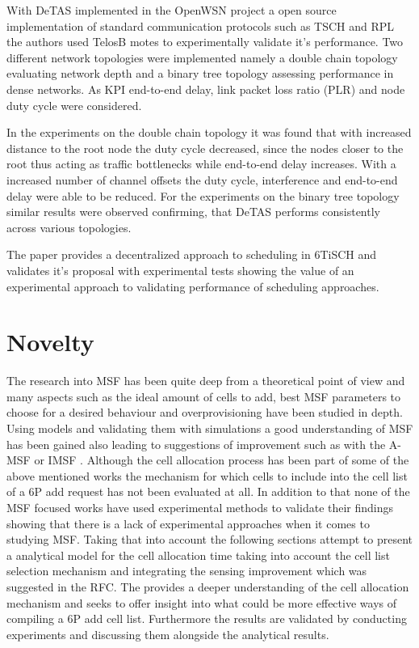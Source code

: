 \documentclass{comnets-thesis}
\begin{document}
With DeTAS implemented in the OpenWSN \cite{Watteyne2012} project a open source implementation of standard communication protocols such as \ac{TSCH} and \ac{RPL} the authors used TelosB motes to experimentally validate it's performance. Two different network topologies were implemented namely a double chain topology evaluating network depth and a binary tree topology assessing performance in dense networks. As \ac{KPI} end-to-end delay, link packet loss ratio (PLR) and node duty cycle were considered.

In the experiments on the double chain topology it was found that with increased distance to the root node the duty cycle decreased, since the nodes closer to the root thus acting as traffic bottlenecks while end-to-end delay increases. With a increased number of channel offsets the duty cycle, interference and end-to-end delay were able to be reduced.
For the experiments on the binary tree topology similar results were observed confirming, that DeTAS performs consistently across various topologies.

The paper provides a decentralized approach to scheduling in \ac{6TiSCH} and validates it's proposal with experimental tests showing the value of an experimental approach to validating performance of scheduling approaches.

\section{Novelty}
The research into \ac{MSF} has been quite deep from a theoretical point of view and many aspects such as the ideal amount of cells to add, best \ac{MSF} parameters to choose for a desired behaviour and overprovisioning have been studied in depth. Using models and validating them with simulations a good understanding of \ac{MSF} has been gained also leading to suggestions of improvement such as with the A-MSF  \cite{MSFPerformanceEvaluation} or IMSF \cite{IMSF}.
Although the cell allocation process has been part of some of the above mentioned works the mechanism for which cells to include into the cell list of a \ac{6P} add request has not been evaluated at all. In addition to that none of the \ac{MSF} focused works have used experimental methods to validate their findings showing that there is a lack of experimental approaches when it comes to studying \ac{MSF}.
Taking that into account the following sections attempt to present a analytical model for the cell allocation time taking into account the cell list selection mechanism and integrating the sensing improvement which was suggested in the RFC. The provides a deeper understanding of the cell allocation mechanism and seeks to offer insight into what could be more effective ways of compiling a \ac{6P} add cell list.
Furthermore the results are validated by conducting experiments and discussing them alongside the analytical results.
\end{document}
